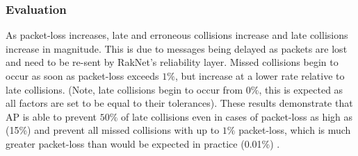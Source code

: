 \subsubsection{Evaluation}
As packet-loss increases, late and erroneous collisions increase and late collisions increase in magnitude. This is due to messages being delayed as packets are lost and need to be re-sent by RakNet's reliability layer. Missed collisions begin to occur as soon as packet-loss exceeds $1\%$, but increase at a lower rate relative to late collisions. (Note, late collisions begin to occur from $0\%$, this is expected as all factors are set to be equal to their tolerances). These results demonstrate that AP is able to prevent $50\%$ of late collisions even in cases of packet-loss as high as (15\%) and prevent all missed collisions with up to $1\%$ packet-loss, which is much greater packet-loss than would be expected in practice (0.01\%) \cite{ThousandEyesCloudPerf2018}.
